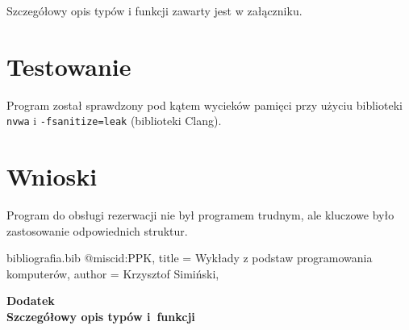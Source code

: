 \documentclass[12pt,a4paper,oneside]{article}
\let\oldmarginpar\marginpar
\renewcommand\marginpar[1]{%
  {\linespread{0.85}\normalfont\scriptsize%
\oldmarginpar[\hspace{1cm}\begin{minipage}{3cm}\raggedleft\scriptsize\color{black}\textsf{#1}\end{minipage}]%
{\hspace{0cm}\begin{minipage}{3cm}\raggedright\scriptsize\color{black}\textsf{#1}\end{minipage}}%
}%
}
\begin{document}
Szczegółowy opis typów i funkcji zawarty jest w załączniku. 

\section{Testowanie}
\marginpar{}

Program został sprawdzony pod kątem wycieków pamięci przy użyciu biblioteki \texttt{nvwa} i \texttt{-fsanitize=leak} (biblioteki Clang).


\section{Wnioski}
\marginpar{}
Program do obsługi rezerwacji nie był programem trudnym, ale kluczowe było zastosowanie odpowiednich struktur.

 
\begin{filecontents}{bibliografia.bib}
@misc{id:PPK,
title = {Wykłady z podstaw programowania komputer\'ow},
author = {Krzysztof Simiński},
}

\end{filecontents}





 
\cleardoublepage

\rule{0cm}{0cm}

\vfill

\begin{center}
\Huge\bfseries Dodatek\\Szczegółowy opis typów i~funkcji\par
\end{center}

\vfill 

\rule{0cm}{0cm}
\end{document}
